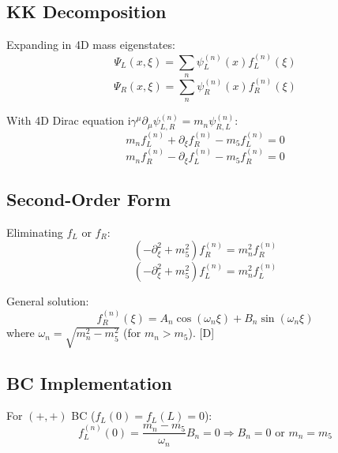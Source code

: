 \documentclass[11pt,a4paper]{article}
\newcommand{\ii}{\mathrm{i}}
\begin{document}
\subsection{KK Decomposition}

Expanding in 4D mass eigenstates:
\begin{equation}
\Psi_L(x,\xi) = \sum_n \psi_L^{(n)}(x) f_L^{(n)}(\xi)
\label{eq:kk-L}
\end{equation}
\begin{equation}
\Psi_R(x,\xi) = \sum_n \psi_R^{(n)}(x) f_R^{(n)}(\xi)
\label{eq:kk-R}
\end{equation}

With 4D Dirac equation $\ii\gamma^\mu\partial_\mu\psi_{L,R}^{(n)} = m_n\psi_{R,L}^{(n)}$:
\begin{equation}
m_n f_L^{(n)} + \partial_\xi f_R^{(n)} - m_5 f_L^{(n)} = 0
\label{eq:profile-L}
\end{equation}
\begin{equation}
m_n f_R^{(n)} - \partial_\xi f_L^{(n)} - m_5 f_R^{(n)} = 0
\label{eq:profile-R}
\end{equation}

\subsection{Second-Order Form}

Eliminating $f_L$ or $f_R$:
\begin{equation}
(-\partial_\xi^2 + m_5^2) f_R^{(n)} = m_n^2 f_R^{(n)}
\label{eq:second-order-R}
\end{equation}
\begin{equation}
(-\partial_\xi^2 + m_5^2) f_L^{(n)} = m_n^2 f_L^{(n)}
\label{eq:second-order-L}
\end{equation}

General solution:
\begin{equation}
f_R^{(n)}(\xi) = A_n \cos(\omega_n\xi) + B_n \sin(\omega_n\xi)
\label{eq:general-R}
\end{equation}
where $\omega_n = \sqrt{m_n^2 - m_5^2}$ (for $m_n > m_5$). [D]

\subsection{BC Implementation}

For $(+,+)$ BC ($f_L(0) = f_L(L) = 0$):
\begin{equation}
f_L^{(n)}(0) = \frac{m_n - m_5}{\omega_n} B_n = 0 \Rightarrow B_n = 0 \text{ or } m_n = m_5
\label{eq:bc-condition-1}
\end{equation}
\end{document}
